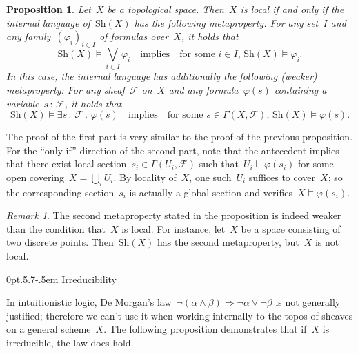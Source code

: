 \documentclass[10pt,reqno,a4paper]{amsbook}
\makeatletter
\theoremstyle{definition}
\theoremstyle{plain}
\newtheorem{prop}[defn]{Proposition}
\theoremstyle{remark}
\newtheorem{rem}[defn]{Remark}
\newcommand{\F}{\mathcal{F}}
\newcommand{\Sh}{\mathrm{Sh}}
\newcommand{\?}{\,{:}\,}
\renewcommand{\_}{\mathpunct{.}\,}
\renewenvironment{proof}[1][\proofname]{\par
  \pushQED{\qed}%
  \normalfont \topsep6\p@\@plus6\p@\relax
  \trivlist
  \item[\hskip\labelsep
        \itshape
    #1\@addpunct{.}]\ignorespaces
}{%
  \popQED\endtrivlist\@endpefalse
}
\def\subsection{\@startsection{subsection}{2}%
  {0pt}{.5\linespacing\@plus.7\linespacing}{-.5em}%
  {\normalfont\bfseries}}
\makeatother
\begin{document}
\begin{prop}\label{prop:local-meta}Let~$X$ be a topological space. Then~$X$ is local if and
only if the internal language of~$\Sh(X)$ has the following metaproperty:
For any set~$I$ and any family~$(\varphi_i)_{i \in I}$ of
formulas over~$X$, it holds that
\[ \Sh(X) \models \bigvee_{i \in I} \varphi_i
  \quad\text{implies}\quad
  \text{for some~$i \in I$, $\Sh(X) \models \varphi_i$}. \]
In this case, the internal language has additionally the following (weaker) metaproperty: For any
sheaf~$\F$ on~$X$ and any formula~$\varphi(s)$ containing a variable~$s\?\F$,
it holds that
\[ \Sh(X) \models \exists s\?\F\_ \varphi(s)
  \quad\text{implies}\quad
  \text{for some~$s \in \Gamma(X,\F)$, $\Sh(X) \models \varphi(s)$}. \]
\end{prop}
\begin{proof}The proof of the first part is very similar to the proof of the
previous proposition. For the ``only if'' direction of the second part, note
that the antecedent implies that there exist local section~$s_i \in
\Gamma(U_i,\F)$ such that~$U_i \models \varphi(s_i)$ for some open covering~$X
= \bigcup_i U_i$. By locality of~$X$, one such~$U_i$ suffices to cover~$X$; so
the corresponding section~$s_i$ is actually a global section and verifies~$X
\models \varphi(s_i)$.
\end{proof}

\begin{rem}The second metaproperty stated in the proposition is indeed weaker
than the condition that~$X$ is local. For instance, let~$X$ be a space consisting
of two discrete points. Then~$\Sh(X)$ has the second metaproperty, but~$X$ is
not local.\end{rem}


\subsection{Irreducibility}

In intuitionistic logic, De Morgan's law~$\neg(\alpha \wedge \beta)
\Rightarrow \neg\alpha \vee \neg\beta$ is not generally justified; therefore we
can't use it when working internally to the topos of sheaves on a general scheme~$X$.
The following proposition demonstrates that if~$X$ is irreducible, the law
does hold.
\end{document}
